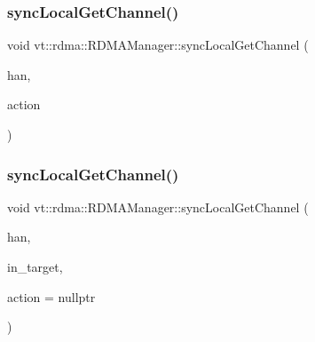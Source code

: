 \subsubsection{\texorpdfstring{sync\+Local\+Get\+Channel()}{syncLocalGetChannel()}\hspace{0.1cm}{\footnotesize\ttfamily [1/2]}}
{\footnotesize\ttfamily void vt\+::rdma\+::\+R\+D\+M\+A\+Manager\+::sync\+Local\+Get\+Channel (\begin{DoxyParamCaption}\item[{\hyperlink{namespacevt_a10442579ec4e7ebef223818e64bcf908}{R\+D\+M\+A\+\_\+\+Handle\+Type} const \&}]{han,  }\item[{\hyperlink{namespacevt_ae0a5a7b18cc99d7b732cb4d44f46b0f3}{Action\+Type} const \&}]{action }\end{DoxyParamCaption})\hspace{0.3cm}{\ttfamily [inline]}}

\mbox{\label{structvt_1_1rdma_1_1_r_d_m_a_manager_aa38b010741db4c375e22662870549dd9}} 
\subsubsection{\texorpdfstring{sync\+Local\+Get\+Channel()}{syncLocalGetChannel()}\hspace{0.1cm}{\footnotesize\ttfamily [2/2]}}
{\footnotesize\ttfamily void vt\+::rdma\+::\+R\+D\+M\+A\+Manager\+::sync\+Local\+Get\+Channel (\begin{DoxyParamCaption}\item[{\hyperlink{namespacevt_a10442579ec4e7ebef223818e64bcf908}{R\+D\+M\+A\+\_\+\+Handle\+Type} const \&}]{han,  }\item[{\hyperlink{namespacevt_a866da9d0efc19c0a1ce79e9e492f47e2}{Node\+Type} const \&}]{in\+\_\+target,  }\item[{\hyperlink{namespacevt_ae0a5a7b18cc99d7b732cb4d44f46b0f3}{Action\+Type} const \&}]{action = {\ttfamily nullptr} }\end{DoxyParamCaption})\hspace{0.3cm}{\ttfamily [inline]}}

\mbox{\label{structvt_1_1rdma_1_1_r_d_m_a_manager_ad09037e1408af7037ca87fc4708700aa}} 
